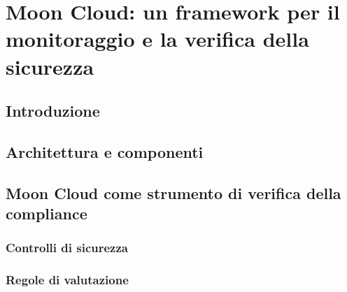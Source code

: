 \documentclass[../main.tex]{subfiles}
\begin{document}
\chapter{Moon Cloud: un framework per il monitoraggio e la verifica della sicurezza}
\section{Introduzione}
\section{Architettura e componenti}
\section{Moon Cloud come strumento di verifica della compliance}
\subsection{Controlli di sicurezza}
\subsection{Regole di valutazione}
\end{document}
